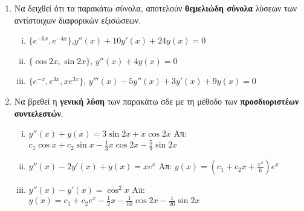 



\pagestyle{askhseis}
\everymath{\displaystyle}




\begin{center}
  \minibox{\large\bfseries \textcolor{Col1}{Ασκήσεις ΣΔΕ 2ης ταξης}}
\end{center}

\vspace{\baselineskip}

\begin{enumerate}
  \item Να δειχθεί ότι τα  παρακάτω σύνολα, αποτελούν \textbf{θεμελιώδη σύνολα} 
    λύσεων των αντίστοιχων διαφορικών εξισώσεων.
    \begin{enumerate}[i)]
      \item $ \{ e^{-6x}, e^{-4x} \} $,\quad $ y''(x)+10y'(x)+24y(x)=0 $ 
      \item $ \{ \cos{2x}, \sin{2x} \}$, \quad $ y''(x)+4y(x)=0 $
      \item $ \{ e^{-x}, e^{3x}, xe^{3x} \} $, \quad $ y'''(x)-5y''(x)+3y'(x)+9y(x)=0 $
    \end{enumerate}

  \item Να βρεθεί η \textbf{γενική λύση} των παρακάτω σδε με τη μέθοδο των 
    \textbf{προσδιοριστέων συντελεστών}.
    \begin{enumerate}[i)]
      \item $y''(x)+y(x)=3\sin 2x + x\cos 2x$ 
        \hfill Απ: $c_{1}\cos x+c_{2}\sin x-\frac{1}{3}x\cos 2x-\frac{5}{9}\sin 2x $
      \item $y''(x)-2y'(x)+y(x)=xe^{x}$ 
        \hfill Απ:  $y(x)=(c_{1}+c_{2}x+\frac{x^{3}}{6})e^{x}$
      \item $y''(x)-y'(x)=\cos^{2}x$ 
        \hfill Απ: $y(x) =c_{1}+c_{2}e^{x}-\frac{1}{2}x-\frac{1}{10}\cos 2x- 
        \frac{1}{20}\sin 2x$
    \end{enumerate}


\end{enumerate}
